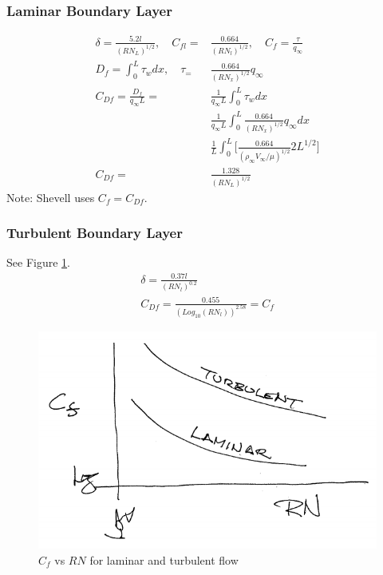 \documentclass[draft=false, titlepage]{article}
\begin{document}
\subsubsection{Laminar Boundary Layer}
\begin{align*}
\delta = \frac{5.2l}{(RN_L)^{1/2}},\quad C_{fl} =& \frac{0.664}{(RN_l)^{1/2}},\quad C_f = \frac{\tau}{q_\infty}\\
D_f = \int_0^L \tau_w dx ,\quad \tau_=& \frac{0.664}{(RN_x)^{1/2}}q_\infty\\
C_{Df} = \frac{D_f}{q_\infty L}=& \frac{1}{q_\infty L}\int_0^L \tau_w dx\\
& \frac{1}{q_\infty L}\int_0^L \frac{0.664}{(RN_x)^{1/2}}q_\infty dx\\
& \frac{1}{L}\int_0^L \Big[ \frac{0.664}{(\rho_\infty V_\infty/\mu)^{1/2}}2L^{1/2} \Big]\\
C_{Df} =& \frac{1.328}{(RN_L)^{1/2}}
\end{align*}
Note: Shevell uses $C_f = C_{Df}$.

\subsubsection{Turbulent Boundary Layer}
See Figure \ref{fig:p21_boundaryLayer}.
\begin{gather*}
\delta = \frac{0.37l}{(RN_l)^{0.2}}\\C_{Df} = \frac{0.455}{(Log_{10}(RN_l))^{2.58}} = C_f
\end{gather*}
\begin{figure}[ht]
	\centering
	\includegraphics[width=0.5\linewidth]{Figures/p21_boundaryLayer.PNG}
	\caption{$C_f$ vs $RN$ for laminar and turbulent flow}
	\label{fig:p21_boundaryLayer}
\end{figure}
\end{document}
